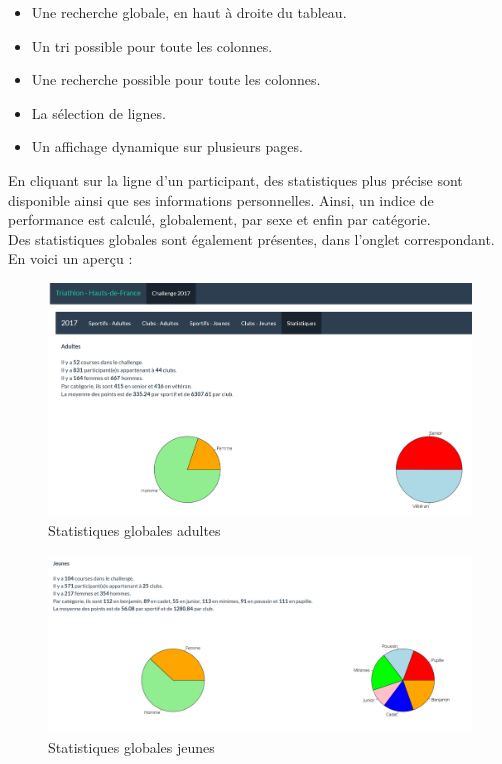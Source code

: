 \begin{itemize} 
	\item Une recherche globale, en haut à droite du tableau.
	\item Un tri possible pour toute les colonnes.
	\item Une recherche possible pour toute les colonnes.
	\item La sélection de lignes.
	\item Un affichage dynamique sur plusieurs pages.
\end{itemize}

En cliquant sur la ligne d'un participant, des statistiques plus précise sont disponible ainsi que ses informations personnelles.
Ainsi, un indice de performance est calculé, globalement, par sexe et enfin par catégorie. \\

Des statistiques globales sont également présentes, dans l'onglet correspondant.
En voici un aperçu :


\begin{figure}[!h]
	\center
	\includegraphics[scale=0.55]{img/statsad.PNG}
	\caption {Statistiques globales adultes}
\end{figure}
\begin{figure}[!h]
	\center
	\includegraphics[scale=0.55]{img/statsjn.PNG}
	\caption {Statistiques globales jeunes}
\end{figure}


